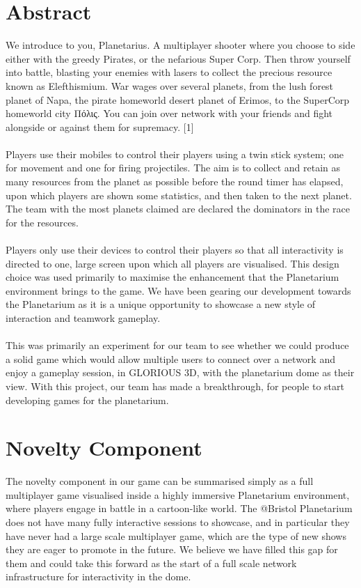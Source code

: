 \documentclass[11pt,a4paper]{article}
\begin{document}
\pagebreak
\tableofcontents

\pagebreak

\section{Abstract}

We introduce to you, Planetarius. A multiplayer shooter where you choose to side either with the greedy Pirates, or the nefarious Super Corp. Then throw yourself into battle, blasting your enemies with lasers to collect the precious resource known as Elefthismium. War wages over several planets, from the lush forest planet of Napa, the pirate homeworld desert planet of Erimos, to the SuperCorp homeworld city Πόλις. You can join over network with your friends and fight alongside or against them for supremacy. [1] \\ \\
Players use their mobiles to control their players using a twin stick system; one for movement and one for firing projectiles. The aim is to collect and retain as many resources from the planet as possible before the round timer has elapsed, upon which players are shown some statistics, and then taken to the next planet. The team with the most planets claimed are declared the dominators in the race for the resources. \\ \\
Players only use their devices to control their players so that all interactivity is directed to one, large screen upon which all players are visualised. This design choice was used primarily to maximise the enhancement that the Planetarium environment brings to the game. We have been gearing our development towards the Planetarium as it is a unique opportunity to showcase a new style of interaction and teamwork gameplay. \\ \\
This was primarily an experiment for our team to see whether we could produce a solid game which would allow multiple users to connect over a network and enjoy a gameplay session, in GLORIOUS 3D, with the planetarium dome as their view. With this project, our team has made a breakthrough, for people to start developing games for the planetarium.


\section{Novelty Component}

 The novelty component in our game can be summarised simply as a full multiplayer game visualised inside a highly immersive Planetarium environment, where players engage in battle in a cartoon-like world. The @Bristol Planetarium does not have many fully interactive sessions to showcase, and in particular they have never had a large scale multiplayer game, which are the type of new shows they are eager to promote in the future. We believe we have filled this gap for them and could take this forward as the start of a full scale network infrastructure for interactivity in the dome. \\ \\
\end{document}
